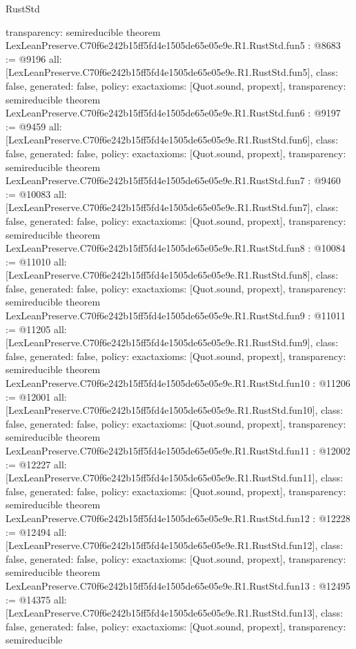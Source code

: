 \begin{lexlean}{RustStd}
\begin{coremodule}
{  transparency: semireducible
}
theorem LexLeanPreserve.C70f6e242b15ff5fd4e1505de65e05e9e.R1.RustStd.fun5 : @8683 := @9196 {
  all: [LexLeanPreserve.C70f6e242b15ff5fd4e1505de65e05e9e.R1.RustStd.fun5],
  class: false,
  generated: false,
  policy: exact{axioms: [Quot.sound, propext]},
  transparency: semireducible
}
theorem LexLeanPreserve.C70f6e242b15ff5fd4e1505de65e05e9e.R1.RustStd.fun6 : @9197 := @9459 {
  all: [LexLeanPreserve.C70f6e242b15ff5fd4e1505de65e05e9e.R1.RustStd.fun6],
  class: false,
  generated: false,
  policy: exact{axioms: [Quot.sound, propext]},
  transparency: semireducible
}
theorem LexLeanPreserve.C70f6e242b15ff5fd4e1505de65e05e9e.R1.RustStd.fun7 : @9460 := @10083 {
  all: [LexLeanPreserve.C70f6e242b15ff5fd4e1505de65e05e9e.R1.RustStd.fun7],
  class: false,
  generated: false,
  policy: exact{axioms: [Quot.sound, propext]},
  transparency: semireducible
}
theorem LexLeanPreserve.C70f6e242b15ff5fd4e1505de65e05e9e.R1.RustStd.fun8 : @10084 := @11010 {
  all: [LexLeanPreserve.C70f6e242b15ff5fd4e1505de65e05e9e.R1.RustStd.fun8],
  class: false,
  generated: false,
  policy: exact{axioms: [Quot.sound, propext]},
  transparency: semireducible
}
theorem LexLeanPreserve.C70f6e242b15ff5fd4e1505de65e05e9e.R1.RustStd.fun9 : @11011 := @11205 {
  all: [LexLeanPreserve.C70f6e242b15ff5fd4e1505de65e05e9e.R1.RustStd.fun9],
  class: false,
  generated: false,
  policy: exact{axioms: [Quot.sound, propext]},
  transparency: semireducible
}
theorem LexLeanPreserve.C70f6e242b15ff5fd4e1505de65e05e9e.R1.RustStd.fun10 : @11206 := @12001 {
  all: [LexLeanPreserve.C70f6e242b15ff5fd4e1505de65e05e9e.R1.RustStd.fun10],
  class: false,
  generated: false,
  policy: exact{axioms: [Quot.sound, propext]},
  transparency: semireducible
}
theorem LexLeanPreserve.C70f6e242b15ff5fd4e1505de65e05e9e.R1.RustStd.fun11 : @12002 := @12227 {
  all: [LexLeanPreserve.C70f6e242b15ff5fd4e1505de65e05e9e.R1.RustStd.fun11],
  class: false,
  generated: false,
  policy: exact{axioms: [Quot.sound, propext]},
  transparency: semireducible
}
theorem LexLeanPreserve.C70f6e242b15ff5fd4e1505de65e05e9e.R1.RustStd.fun12 : @12228 := @12494 {
  all: [LexLeanPreserve.C70f6e242b15ff5fd4e1505de65e05e9e.R1.RustStd.fun12],
  class: false,
  generated: false,
  policy: exact{axioms: [Quot.sound, propext]},
  transparency: semireducible
}
theorem LexLeanPreserve.C70f6e242b15ff5fd4e1505de65e05e9e.R1.RustStd.fun13 : @12495 := @14375 {
  all: [LexLeanPreserve.C70f6e242b15ff5fd4e1505de65e05e9e.R1.RustStd.fun13],
  class: false,
  generated: false,
  policy: exact{axioms: [Quot.sound, propext]},
  transparency: semireducible
}
\end{coremodule}
\end{lexlean}
